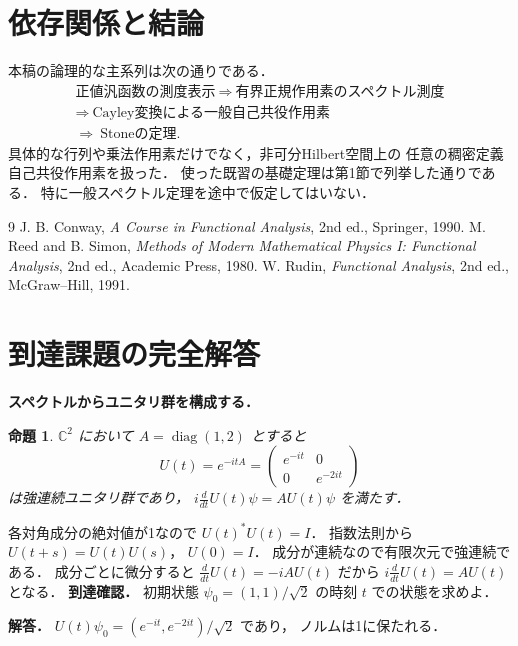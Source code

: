 \documentclass[a5paper,10pt,onecolumn]{jsarticle}
\makeatletter
\theoremstyle{mathnotetheorem}
\newtheorem{proposition}[theorem]{命題}
\renewcommand{\proofname}{証明}
\renewenvironment{proof}[1][\proofname]{%
  \par\pushQED{\qed}\normalfont\topsep4\p@\@plus2\p@\relax
  \trivlist\item[\hskip\labelsep\bfseries #1]\ignorespaces
}{\popQED\endtrivlist\@endpefalse}
\makeatother
\begin{document}
\section{依存関係と結論}
本稿の論理的な主系列は次の通りである．
\[
 \begin{gathered}
 \text{正値汎函数の測度表示}\ \Longrightarrow\
 \text{有界正規作用素のスペクトル測度}\\
 \Longrightarrow\ \text{Cayley変換による一般自己共役作用素}\\
 \Longrightarrow\ \text{Stoneの定理}.
 \end{gathered}
\]
具体的な行列や乗法作用素だけでなく，非可分Hilbert空間上の
任意の稠密定義自己共役作用素を扱った．
使った既習の基礎定理は第1節で列挙した通りである．
特に一般スペクトル定理を途中で仮定してはいない．

\begin{thebibliography}{9}
 J. B. Conway, \emph{A Course in Functional Analysis},
 2nd ed., Springer, 1990.
 M. Reed and B. Simon,
 \emph{Methods of Modern Mathematical Physics I: Functional Analysis},
 2nd ed., Academic Press, 1980.
 W. Rudin, \emph{Functional Analysis},
 2nd ed., McGraw--Hill, 1991.
\end{thebibliography}

\section{到達課題の完全解答}
\noindent\textbf{スペクトルからユニタリ群を構成する．}
\begin{proposition}
$\mathbb C^2$ において
$A=\operatorname{diag}(1,2)$ とすると
\[
U(t)=e^{-itA}
=\begin{pmatrix}e^{-it}&0\\0&e^{-2it}\end{pmatrix}
\]
は強連続ユニタリ群であり，
$i\frac d{dt}U(t)\psi=AU(t)\psi$ を満たす．
\end{proposition}
\begin{proof}
各対角成分の絶対値が1なので
$U(t)^*U(t)=I$．
指数法則から $U(t+s)=U(t)U(s)$，
$U(0)=I$．
成分が連続なので有限次元で強連続である．
成分ごとに微分すると
$\frac d{dt}U(t)=-iAU(t)$ だから
$ i\frac d{dt}U(t)=AU(t)$ となる．
\end{proof}
\noindent\textbf{到達確認．}
初期状態 $\psi_0=(1,1)/\sqrt2$ の時刻 $t$ での状態を求めよ．
\par\noindent\textbf{解答．}
$U(t)\psi_0=(e^{-it},e^{-2it})/\sqrt2$ であり，
ノルムは1に保たれる．
\end{document}
